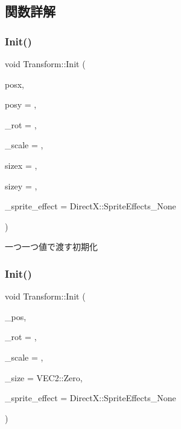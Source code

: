 \subsection{関数詳解}
\mbox{\label{class_transform_a4445dcada4d075e1994b78b660d96a6d}} 
\subsubsection{\texorpdfstring{Init()}{Init()}\hspace{0.1cm}{\footnotesize\ttfamily [1/3]}}
{\footnotesize\ttfamily void Transform\+::\+Init (\begin{DoxyParamCaption}\item[{const float}]{posx,  }\item[{const float}]{posy = {},  }\item[{const float}]{\+\_\+rot = {},  }\item[{const float}]{\+\_\+scale = {},  }\item[{const float}]{sizex = {},  }\item[{const float}]{sizey = {},  }\item[{const Direct\+X\+::\+Sprite\+Effects}]{\+\_\+sprite\+\_\+effect = {\ttfamily DirectX\+:\+:SpriteEffects\+\_\+None} }\end{DoxyParamCaption})}



一つ一つ値で渡す初期化 

\mbox{\label{class_transform_a9f05c957bb87a0e838c3499df19edaa2}} 
\subsubsection{\texorpdfstring{Init()}{Init()}\hspace{0.1cm}{\footnotesize\ttfamily [2/3]}}
{\footnotesize\ttfamily void Transform\+::\+Init (\begin{DoxyParamCaption}\item[{const \mbox{\hyperlink{common_8h_afb0c5e21d4133ff4f200992c0b534e1b}{V\+E\+C2}} \&}]{\+\_\+pos,  }\item[{const float}]{\+\_\+rot = {},  }\item[{const float}]{\+\_\+scale = {},  }\item[{const \mbox{\hyperlink{common_8h_afb0c5e21d4133ff4f200992c0b534e1b}{V\+E\+C2}} \&}]{\+\_\+size = {\ttfamily VEC2\+:\+:Zero},  }\item[{const Direct\+X\+::\+Sprite\+Effects}]{\+\_\+sprite\+\_\+effect = {\ttfamily DirectX\+:\+:SpriteEffects\+\_\+None} }\end{DoxyParamCaption})}



